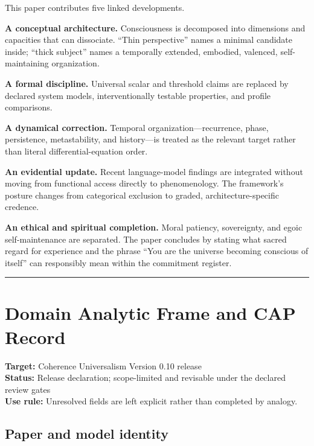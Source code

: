 \documentclass[
  11pt,
]{article}
\begin{document}
This paper contributes five linked developments.

\textbf{A conceptual architecture.} Consciousness is decomposed into
dimensions and capacities that can dissociate. ``Thin perspective''
names a minimal candidate inside; ``thick subject'' names a temporally
extended, embodied, valenced, self-maintaining organization.

\textbf{A formal discipline.} Universal scalar and threshold claims are
replaced by declared system models, interventionally testable
properties, and profile comparisons.

\textbf{A dynamical correction.} Temporal organization---recurrence,
phase, persistence, metastability, and history---is treated as the
relevant target rather than literal differential-equation order.

\textbf{An evidential update.} Recent language-model findings are
integrated without moving from functional access directly to
phenomenology. The framework's posture changes from categorical
exclusion to graded, architecture-specific credence.

\textbf{An ethical and spiritual completion.} Moral patiency,
sovereignty, and egoic self-maintenance are separated. The paper
concludes by stating what sacred regard for experience and the phrase
``You are the universe becoming conscious of itself'' can responsibly
mean within the commitment register.

\begin{center}\rule{0.5\linewidth}{0.5pt}\end{center}

\section{Domain Analytic Frame and CAP
Record}\label{domain-analytic-frame-and-cap-record}

\textbf{Target:} Coherence Universalism Version 0.10 release\\
\textbf{Status:} Release declaration; scope-limited and revisable under
the declared review gates\\
\textbf{Use rule:} Unresolved fields are left explicit rather than
completed by analogy.

\subsection{Paper and model identity}\label{paper-and-model-identity}
\end{document}
